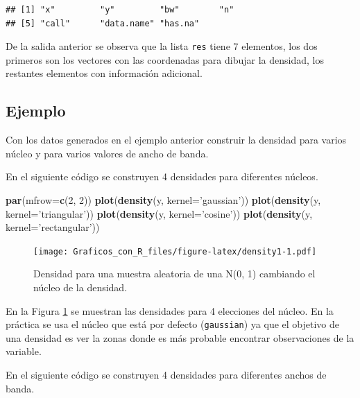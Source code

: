 \documentclass[10pt,]{krantz}
\makeatletter
\newenvironment{Shaded}{\begin{snugshade}}{\end{snugshade}}
\newcommand{\KeywordTok}[1]{\textcolor[rgb]{0.13,0.29,0.53}{\textbf{{#1}}}}
\newcommand{\DataTypeTok}[1]{\textcolor[rgb]{0.13,0.29,0.53}{{#1}}}
\newcommand{\DecValTok}[1]{\textcolor[rgb]{0.00,0.00,0.81}{{#1}}}
\newcommand{\StringTok}[1]{\textcolor[rgb]{0.31,0.60,0.02}{{#1}}}
\newcommand{\NormalTok}[1]{{#1}}
\newenvironment{kframe}{%
\medskip{}
\setlength{\fboxsep}{.8em}
 \def\at@end@of@kframe{}%
 \ifinner\ifhmode%
  \def\at@end@of@kframe{\end{minipage}}%
  \begin{minipage}{\columnwidth}%
 \fi\fi%
 \def\FrameCommand##1{\hskip\@totalleftmargin \hskip-\fboxsep
 \colorbox{shadecolor}{##1}\hskip-\fboxsep
     \hskip-\linewidth \hskip-\@totalleftmargin \hskip\columnwidth}%
 \MakeFramed {\advance\hsize-\width
   \@totalleftmargin\z@ \linewidth\hsize
   \@setminipage}}%
 {\par\unskip\endMakeFramed%
 \at@end@of@kframe}
\renewenvironment{Shaded}{\begin{kframe}}{\end{kframe}}
\makeatother
\begin{document}
\begin{verbatim}
## [1] "x"         "y"         "bw"        "n"        
## [5] "call"      "data.name" "has.na"
\end{verbatim}

De la salida anterior se observa que la lista \texttt{res} tiene 7
elementos, los dos primeros son los vectores con las coordenadas para
dibujar la densidad, los restantes elementos con información adicional.

\subsection*{Ejemplo}\label{ejemplo-6}


Con los datos generados en el ejemplo anterior construir la densidad
para varios núcleo y para varios valores de ancho de banda.

En el siguiente código se construyen 4 densidades para diferentes
núcleos.

\begin{Shaded}
\begin{Highlighting}[]
\KeywordTok{par}\NormalTok{(}\DataTypeTok{mfrow=}\KeywordTok{c}\NormalTok{(}\DecValTok{2}\NormalTok{, }\DecValTok{2}\NormalTok{))}
\KeywordTok{plot}\NormalTok{(}\KeywordTok{density}\NormalTok{(y, }\DataTypeTok{kernel=}\StringTok{'gaussian'}\NormalTok{))}
\KeywordTok{plot}\NormalTok{(}\KeywordTok{density}\NormalTok{(y, }\DataTypeTok{kernel=}\StringTok{'triangular'}\NormalTok{))}
\KeywordTok{plot}\NormalTok{(}\KeywordTok{density}\NormalTok{(y, }\DataTypeTok{kernel=}\StringTok{'cosine'}\NormalTok{))}
\KeywordTok{plot}\NormalTok{(}\KeywordTok{density}\NormalTok{(y, }\DataTypeTok{kernel=}\StringTok{'rectangular'}\NormalTok{))}
\end{Highlighting}
\end{Shaded}

\begin{figure}[htbp]
\centering
\texttt{[image: Graficos\_con\_R\_files/figure-latex/density1-1.pdf]}
\caption{\label{fig:density1}Densidad para una muestra aleatoria de una N(0,
1) cambiando el núcleo de la densidad.}
\end{figure}

En la Figura \ref{fig:density1} se muestran las densidades para 4
elecciones del núcleo. En la práctica se usa el núcleo que está por
defecto (\texttt{gaussian}) ya que el objetivo de una densidad es ver la
zonas donde es más probable encontrar observaciones de la variable.

En el siguiente código se construyen 4 densidades para diferentes anchos
de banda.
\end{document}
